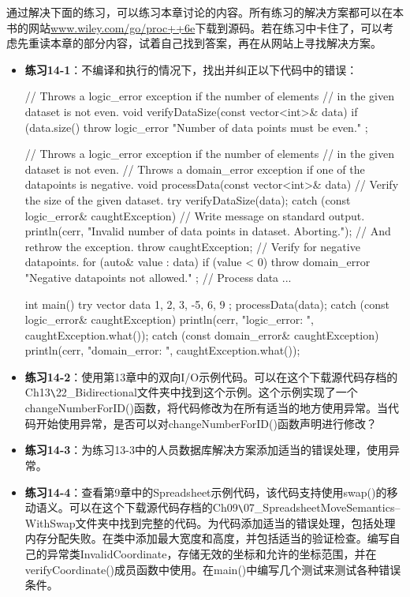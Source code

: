 通过解决下面的练习，可以练习本章讨论的内容。所有练习的解决方案都可以在本书的网站\url{www.wiley.com/go/proc++6e}下载到源码。若在练习中卡住了，可以考虑先重读本章的部分内容，试着自己找到答案，再在从网站上寻找解决方案。

\begin{itemize}
\item
\textbf{练习14-1}：不编译和执行的情况下，找出并纠正以下代码中的错误：

\begin{cpp}
// Throws a logic_error exception if the number of elements
// in the given dataset is not even.
void verifyDataSize(const vector<int>& data)
{
    if (data.size() %
        throw logic_error { "Number of data points must be even." };
}

// Throws a logic_error exception if the number of elements
// in the given dataset is not even.
// Throws a domain_error exception if one of the datapoints is negative.
void processData(const vector<int>& data)
{
    // Verify the size of the given dataset.
    try {
        verifyDataSize(data);
    } catch (const logic_error& caughtException) {
        // Write message on standard output.
        println(cerr, "Invalid number of data points in dataset. Aborting.");
        // And rethrow the exception.
        throw caughtException;
    }
    // Verify for negative datapoints.
    for (auto& value : data) {
        if (value < 0)
            throw domain_error { "Negative datapoints not allowed." };
    }
    // Process data ...
}

int main()
{
    try {
        vector data { 1, 2, 3, -5, 6, 9 };
        processData(data);
    } catch (const logic_error& caughtException) {
        println(cerr, "logic_error: {}", caughtException.what());
    } catch (const domain_error& caughtException) {
        println(cerr, "domain_error: {}", caughtException.what());
    }
}
\end{cpp}

\item
\textbf{练习14-2}：使用第13章中的双向I/O示例代码。可以在这个下载源代码存档的Ch13\verb|\|22\_Bidirectional文件夹中找到这个示例。这个示例实现了一个changeNumberForID()函数，将代码修改为在所有适当的地方使用异常。当代码开始使用异常，是否可以对changeNumberForID()函数声明进行修改？

\item
\textbf{练习14-3}：为练习13-3中的人员数据库解决方案添加适当的错误处理，使用异常。

\item
\textbf{练习14-4}：查看第9章中的Spreadsheet示例代码，该代码支持使用swap()的移动语义。可以在这个下载源代码存档的Ch09\verb|\|07\_SpreadsheetMoveSemantics–WithSwap文件夹中找到完整的代码。为代码添加适当的错误处理，包括处理内存分配失败。在类中添加最大宽度和高度，并包括适当的验证检查。编写自己的异常类InvalidCoordinate，存储无效的坐标和允许的坐标范围，并在verifyCoordinate()成员函数中使用。在main()中编写几个测试来测试各种错误条件。
\end{itemize}














